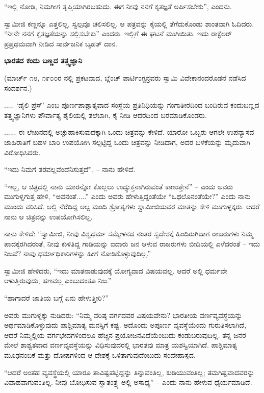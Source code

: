 “ಇಲ್ಲಿ ನೋಡಿ, ನಿಮಗೀಗ ತೃಪ್ತಿಯಾಗಿರಬಹುದು. ಈಗ ನೀವು ನನಗೆ ಕೃತಜ್ಞತೆ ಅರ್ಪಿಸಬೇಕು”, ಎಂದನು.

ಸ್ವಾಮೀಜಿ ಕಣ್ಣನ್ನೂ ಎತ್ತಲಿಲ್ಲ, ಸ್ವಲ್ಪವೂ ಚಲಿಸಲಿಲ್ಲ. ಆ ಪತ್ರವನ್ನು ಕೈಯಲ್ಲಿ ತೆಗೆದುಕೊಂಡು ಶಾಂತವಾಗಿ ಓದಿದರು. “ನೀನೇ ನನಗೆ ಕೃತಜ್ಞತೆಯನ್ನು ಸಲ್ಲಿಸಬೇಕು” ಎಂದರು. ಇಲ್ಲಿಗೆ ಈ ಘಟನೆ ಮುಗಿಯಿತು. ಇದು ರಾಕ್ಫೆಲರ್ ಪ್ರಪ್ರಥಮವಾಗಿ ನೀಡಿದ ಸಾರ್ವಜನಿಕ ಬೃಹತ್ ದಾನ.

\begin{center}
\textbf{ಭಾರತದ ಕಂದು ಬಣ್ಣದ ತತ್ತ್ವಜ್ಞಾನಿ}
\end{center}

(ಮಾರ್ಚ್ ೧೮, ೧೯೦೦ರ ನಲ್ಲಿ ಪ್ರಕಟವಾದ, ಬ್ಲೆಂಚ್ ಪಾರ್ಟಿಂಗ್ಟನ್ರವರು ಸ್ವಾಮಿ ವಿವೇಕಾನಂದರೊಡನೆ ನಡೆಸಿದ ಸಂದರ್ಶನ.)

..... ‘ಡೈಲಿ ಪ್ರೆಸ್’ ಎಂಬ ಪೂರ್ಣಪಾಶ್ಚಾತ್ಯವಾದ ಸಂಸ್ಥೆಯ ಪ್ರತಿನಿಧಿಯನ್ನು ಗಂಗಾತೀರದಿಂದ ಬಂದಿರುವ ಕಂದುಬಣ್ಣದ ತತ್ತ್ವಜ್ಞಾನಿಗಳು ಪೌರ್ವಾತ್ಯ ಶೈಲಿಯಲ್ಲಿ ತಲೆಬಾಗಿ, ಕೈ ನೀಡಿ ಆದರದಿಂದ ಬರಮಾಡಿಕೊಂಡರು.

...... ಈ ಲೇಖನದಲ್ಲಿ ಅಚ್ಚುಹಾಕಿಸುವುದಕ್ಕಾಗಿ ಒಂದು ಚಿತ್ರವನ್ನು ಕೇಳಿದೆ. ಯಾರೋ ಒಬ್ಬರು ಆಗಲೇ ಉಪನ್ಯಾಸದ ಜಾಹಿರಾತಿಗೆ ಬಹಳ ಬಾರಿ ಉಪಯೋಗಿ ಸಲ್ಪಟ್ಟಿದ್ದ ಒಂದು ಚಿತ್ರವನ್ನು ನೀಡಿದಾಗ, ಅದರ ಬಳಕೆಯನ್ನು ಮೃದುವಾಗಿ ವಿರೋಧಿಸಿದರು.

“ಇದು ನಿಮಗೆ ತರವಲ್ಲವೆಂದೆನಿಸುತ್ತದೆ”, – ನಾನು ಹೇಳಿದೆ.

“ಇಲ್ಲ, ಆ ಚಿತ್ರದಲ್ಲಿ ನಾನು ಯಾರನ್ನೋ ಕೊಲ್ಲಲು ಉದ್ಯುಕ್ತನಾಗಿರುವಂತೆ ಕಾಣುತ್ತೇನೆ” – ಎಂದು ಅವರು ಮುಗುಳ್ನಗುತ್ತ ಹೇಳಿ, “ಅವನಂತೆ.....” ಎಂದು ಅವರು ಹೇಳುತ್ತಿದ್ದಂತೆಯೇ “ಒಥಲೊನಂತೆಯೇ?” ಎಂದು ನಾನು ಮುಂದು ವರಿಸಿದೆ. ಅಲ್ಲಿ ನೆರೆದಿದ್ದ ಅಲ್ಪ ಮಂದಿ ಶ್ರೋತೃಗಳು ಸ್ವಾಮೀಜಿಯವರ ಮಾತನ್ನು ಕೇಳಿ ಮುಗುಳ್ನಕ್ಕರು. ಆದರೆ ನಾನು ಆ ಚಿತ್ರವನ್ನು ಉಪಯೋಗಿಸಲಿಲ್ಲ.

ನಾನು ಕೇಳಿದೆ: “ಸ್ವಾಮೀಜಿ, ನೀವು ವಿಶ್ವಧರ್ಮ ಸಮ್ಮೇಳನದ ನಂತರ ಸ್ವದೇಶಕ್ಕೆ ಹಿಂದಿರುಗಿದಾಗ ರಾಜರುಗಳು ನಿಮ್ಮ ಪಾದಕ್ಕೆರಗಿದರಂತೆ, ನೀವು ಕುಳಿತಿದ್ದ ಗಾಡಿಯನ್ನು ಐದಾರು ಜನ ಆಳುವ ರಾಜರುಗಳು ಬೀದಿಯಲ್ಲಿ ಎಳೆದರಂತೆ – ಇದು ನಿಜವೆ? ನಾವು ಧರ್ಮಾಧಿಕಾರಿಗಳನ್ನು ಹೀಗೆ ನೋಡಿಕೊಳ್ಳುವುದಿಲ್ಲ.”

ಸ್ವಾಮೀಜಿ ಹೇಳಿದರು, “ಇದು ಮಾತನಾಡುವುದಕ್ಕೆ ಯೋಗ್ಯವಾದ ವಿಷಯವಲ್ಲ. ಆದರೆ ಅಲ್ಲಿ ಧರ್ಮವೇ ಆಳುತ್ತಿರುವುದು, ಹಣವಲ್ಲ ಎಂಬುದಂತೂ ನಿಜ.”

“ಹಾಗಾದರೆ ಜಾತಿಯ ಬಗ್ಗೆ ಏನು ಹೇಳುತ್ತೀರಿ?”

ಅವರು ಮುಗುಳ್ನಕ್ಕು ನುಡಿದರು: “ನಿಮ್ಮ ವರಿಷ್ಠ ವರ್ಗದವರ ವಿಷಯವೇನು? ಭಾರತೀಯ ವರ್ಣವ್ಯವಸ್ಥೆಯನ್ನು ಅರ್ಥಮಾಡಿಕೊಳ್ಳುವುದು ಪಾಶ್ಚಿಮಾತ್ಯ ಮನಸ್ಸಿಗೆ ಕಷ್ಟ. ಅದೊಂದು ಅಪೂರ್ಣ ವ್ಯವಸ್ಥೆಯೆಂದು ಗುರುತಿಸಲಾಗಿದೆ, ಆದರೆ ನಿಮ್ಮಲ್ಲಿಯ ವರ್ಗಭೇದಗಳಿಂದಲೂ ಹೆಚ್ಚಿನ ಪ್ರಯೋಜನವಿದೆಯೆಂಬುದು ಕಂಡುಬರುವುದಿಲ್ಲ. ತನ್ನ ಜನರ ಮೇಲೆ ಶಾಶ್ವತವಾದ ವರ್ಣವ್ಯವಸ್ಥೆಯನ್ನು ವಿಧಿಸುವುದರಲ್ಲಿ ಭಾರತವು ಮಾತ್ರ ಯಶಸ್ವಿಯಾಗಿದೆ. ಪಾಶ್ಚಿಮಾತ್ಯ ಮೂಢನಂಬಿಕೆ ಮತ್ತು ದೋಷಗಳಿಂದ ಆ ದೇಶಕ್ಕೆ ಒಳಿತಾಗುವುದೆಂಬುದು ಸಂದೇಹಾಸ್ಪದ.

“ಆದರೆ ಅಂತಹ ವ್ಯವಸ್ಥೆಯಲ್ಲಿ ಯಾರೂ ತಾವಿಷ್ಟಪಟ್ಟಿದ್ದನ್ನು ತಿನ್ನುವಂತಿಲ್ಲ, ಕುಡಿಯುವಂತಿಲ್ಲ; ತಮಗಿಷ್ಟವಾದವರನ್ನು ವಿವಾಹವಾಗುವಂತಿಲ್ಲ. ನೀವು ಬೋಧಿಸುವ ಸ್ವಾತಂತ್ರ್ಯ ಅಲ್ಲಿ ಅಸಾಧ್ಯ” – ಎಂದು ನಾನು ಹೇಳುವ ಧೈರ್ಯಮಾಡಿದೆ.

